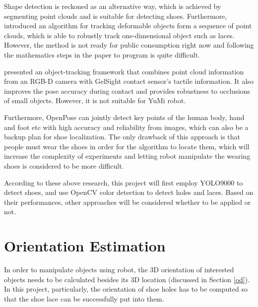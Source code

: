 Shape detection is reckoned as an alternative way, which is achieved by segmenting point clouds and is suitable for detecting shoes. Furthermore, \citep{deformable_track} introduced an algorithm for tracking deformable objects form a sequence of point clouds, which is able to robustly track one-dimensional object such as laces. However, the method is not ready for public consumption right now and following the mathematics steps in the paper to program is quite difficult. 

\citep{vision_touch} presented an object-tracking framework that combines point cloud information from an RGB-D camera with GelSight contact sensor's tactile information. It also improves the pose accuracy during contact and provides robustness to occlusions of small objects. However, it is not suitable for YuMi robot.

Furthermore, OpenPose \citep{openpose} can jointly detect key points of the human body, hand and foot etc with high accuracy and reliability from images, which can also be a backup plan for shoe localization. The only drawback of this approach is that people must wear the shoes in order for the algorithm to locate them, which will increase the complexity of experiments and letting robot manipulate the wearing shoes is considered to be more difficult.

According to these above research, this project will first employ YOLO9000 to detect shoes, and use OpenCV color detection to detect holes and laces. Based on their performances, other approaches will be considered whether to be applied or not.

\section{Orientation Estimation}
In order to manipulate objects using robot, the 3D orientation of interested objects needs to be calculated besides its 3D location (discussed in Section \ref{od}). In this project, particularly, the orientation of shoe holes has to be computed so that the shoe lace can be successfully put into them.

